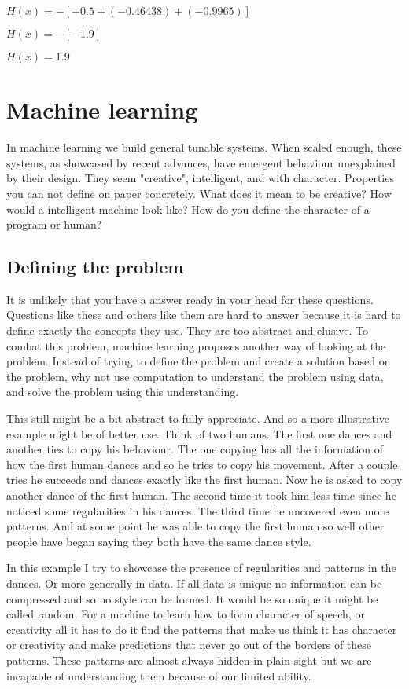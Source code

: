 \documentclass{article}
\begin{document}
$H(x) = -[-0.5 + (-0.46438) + (-0.9965)]$

$H(x) = -[-1.9]$

$H(x) = 1.9$


\section{Machine learning} 
In machine learning we build general tunable systems. When scaled enough, these systems,
as showcased by recent advances, have emergent behaviour unexplained by their design. 
They seem "creative", intelligent, and with character. Properties you can not define on
paper concretely. What does it mean to be creative? How would a intelligent machine look
like? How do you define the character of a program or human?

\subsection{Defining the problem}
It is unlikely that you have a answer ready in your head for these questions. Questions like
these and others like them are hard to answer because it is hard to define exactly the 
concepts they use. They are too abstract and elusive. To combat this problem, machine 
learning proposes another way of looking at the problem. Instead of trying to define the 
problem and create a solution based on the problem, why not use computation to understand 
the problem using data, and solve the problem using this understanding.

This still might be a bit abstract to fully appreciate. And so a more illustrative example 
might be of better use. Think of two humans. The first one dances and another ties to copy 
his behaviour. The one copying has all the information of how the first human dances and so 
he tries to copy his movement. After a couple tries he succeeds and dances exactly like the 
first human. Now he is asked to copy another dance of the first human. The second time it 
took him less time since he noticed some regularities in his dances. The third time he 
uncovered even more patterns. And at some point he was able to copy the first human so well 
other people have began saying they both have the same dance style. 

In this example I try to showcase the presence of regularities and patterns in the dances. 
Or more generally in data. If all data is unique no information can be compressed and so 
no style can be formed. It would be so unique it might be called random. For a machine 
to learn how to form character of speech, or creativity all it has to do it find the 
patterns that make us think it has character or creativity and make predictions that 
never go out of the borders of these patterns. These patterns are almost always hidden in
plain sight but we are incapable of understanding them because of our limited ability.
\end{document}
